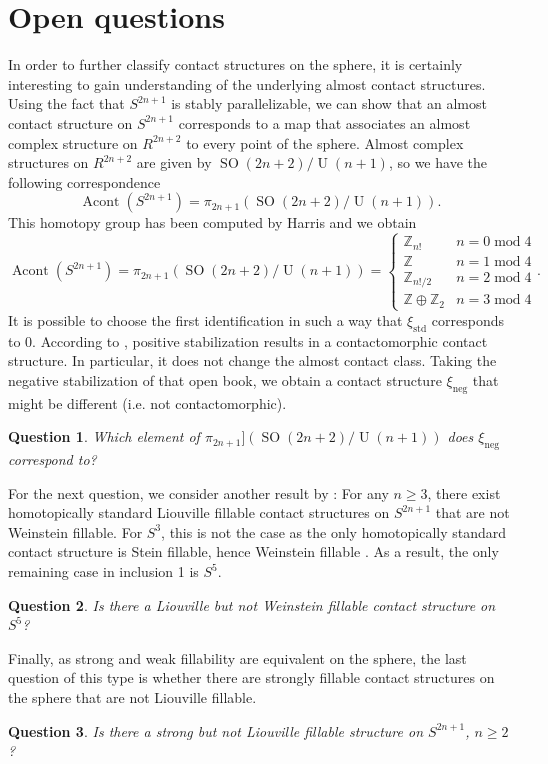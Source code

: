 \documentclass{amsart}
\newtheorem{question}{Question}
\begin{document}
\section*{Open questions}
In order to further classify contact structures on the sphere, it is certainly interesting to gain understanding of the underlying almost contact structures.
Using the fact that $S^{2n+1}$ is stably parallelizable, we can show that an almost contact structure on $S^{2n+1}$ corresponds to a map that associates an almost complex structure on $R^{2n+2}$
to every point of the sphere.
Almost complex structures on $R^{2n+2}$ are given by $\operatorname{SO}(2n + 2)/\operatorname{U}(n + 1)$, so we have the following correspondence
\[
    \operatorname{Acont}\left(S^{2n+1}\right) = \pi_{2n+1}(\operatorname{SO}(2n + 2)/\operatorname{U}(n + 1)).
\]
This homotopy group has been computed by Harris \cite{Harris63} and we obtain
\[
    \operatorname{Acont}\left(S^{2n+1}\right) = \pi_{2n+1}(\operatorname{SO}(2n + 2)/\operatorname{U}(n + 1)) = \begin{cases}
        \mathbb Z_{n!} &n = 0 \operatorname{mod} 4\\
        \mathbb Z &n = 1 \operatorname{mod} 4\\
        \mathbb Z_{n!/2} &n = 2 \operatorname{mod} 4\\
        \mathbb Z \oplus \mathbb Z_2 &n = 3 \operatorname{mod} 4
    \end{cases}.
\]
It is possible to choose the first identification in such a way that $\xi_{\mathrm{std}}$ corresponds to $0$.
According to \cite{Giroux02}, positive stabilization results in a contactomorphic
contact structure. In particular, it does not change the almost contact class.
Taking the negative stabilization of that open book, we obtain a contact structure $\xi_\mathrm{neg}$ that might be different (i.e. not contactomorphic).
\begin{question}
     Which element of $\pi_{2n+1}](\operatorname{SO}(2n + 2)/\operatorname{U}(n + 1))$ does $\xi_\mathrm{neg}$ correspond to?
\end{question}

For the next question, we consider another result by \cite{BGMZ22}: For any $n \geq 3$, there exist homotopically standard Liouville fillable contact structures on $S^{2n+1}$ that are not Weinstein fillable.
For $S^3$, this is not the case as the only homotopically standard contact structure is
Stein fillable, hence Weinstein fillable \cite{CE12}.
As a result, the only remaining case in inclusion 1 is $S^5$.
\begin{question}
Is there a Liouville but not Weinstein fillable contact structure on $S^5$? 
\end{question}
Finally, as strong and weak fillability are equivalent on the sphere,
the last question of this type is whether there are strongly fillable contact structures on the sphere that are not Liouville fillable.
\begin{question}
    Is there a strong but not Liouville fillable structure on $S^{2n+1}$, $n \ge 2$?
\end{question}
\newpage
\nocite{*}


\end{document}
